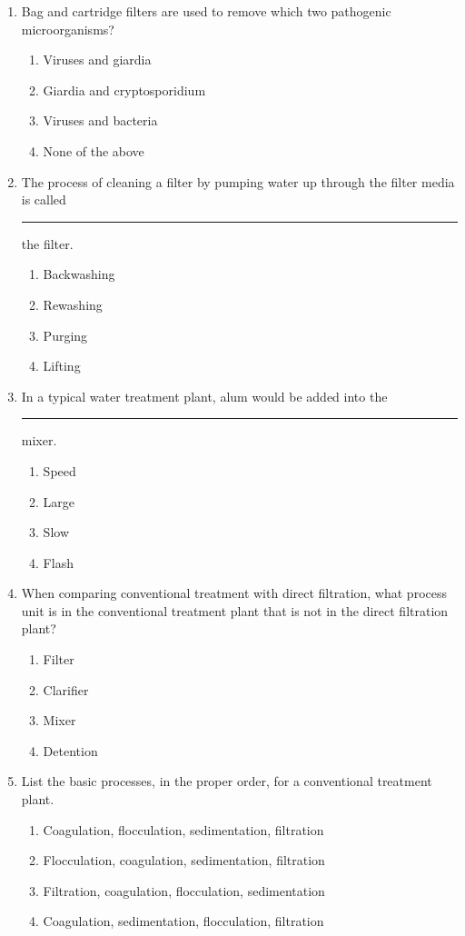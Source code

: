 \documentclass[10pt]{article}
\begin{document}
\begin{enumerate}
\begin{enumerate}
\item Bag and cartridge filters are used to remove which two pathogenic microorganisms?
\begin{enumerate}
\item Viruses and giardia
\item Giardia and cryptosporidium
\item Viruses and bacteria
\item None of the above
\end{enumerate}

\item The process of cleaning a filter by pumping water up through the filter media is called \rule{2cm}{0.3pt} the filter.
\begin{enumerate}
\item Backwashing
\item Rewashing
\item Purging
\item Lifting
\end{enumerate}

\item In a typical water treatment plant, alum would be added into the \rule{2cm}{0.3pt} mixer.
\begin{enumerate}
\item Speed
\item Large
\item Slow
\item Flash
\end{enumerate}

\item When comparing conventional treatment with direct filtration, what process unit is in the conventional treatment plant that is not in the direct filtration plant?
\begin{enumerate}
\item Filter
\item Clarifier
\item Mixer
\item Detention
\end{enumerate}

\item List the basic processes, in the proper order, for a conventional treatment plant.
\begin{enumerate}
\item Coagulation, flocculation, sedimentation, filtration
\item Flocculation, coagulation, sedimentation, filtration
\item Filtration, coagulation, flocculation, sedimentation
\item Coagulation, sedimentation, flocculation, filtration
\end{enumerate}


\end{enumerate}
\end{enumerate}
\end{document}

